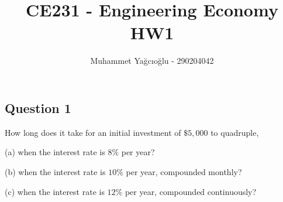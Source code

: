\documentclass[12pt]{article}
\title{\vspace{-1cm}CE231 - Engineering Economy HW1}
\author{Muhammet Yağcıoğlu - 290204042}
\begin{document}
\pagestyle{fancy}
\maketitle\thispagestyle{fancy}

\tableofcontents

\newpage
\subsection*{Question 1}
\begin{q}
How long does it take for an initial investment of \(\$ 5,000\) to quadruple,

(a) when the interest rate is \(8 \%\) per year?

(b) when the interest rate is \(10 \%\) per year, compounded monthly?

(c) when the interest rate is \(12 \%\) per year, compounded continuously?
\end{q}
\end{document}
